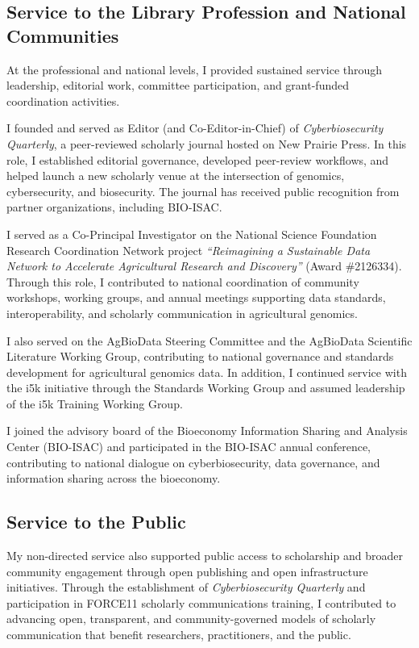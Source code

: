 \subsection*{Service to the Library Profession and National Communities}

At the professional and national levels, I provided sustained service through leadership, editorial work, committee participation, and grant-funded coordination activities.

I founded and served as Editor (and Co-Editor-in-Chief) of \textit{Cyberbiosecurity Quarterly}, a peer-reviewed scholarly journal hosted on New Prairie Press. In this role, I established editorial governance, developed peer-review workflows, and helped launch a new scholarly venue at the intersection of genomics, cybersecurity, and biosecurity. The journal has received public recognition from partner organizations, including BIO-ISAC.

I served as a Co-Principal Investigator on the National Science Foundation Research Coordination Network project \textit{``Reimagining a Sustainable Data Network to Accelerate Agricultural Research and Discovery''} (Award \#2126334). Through this role, I contributed to national coordination of community workshops, working groups, and annual meetings supporting data standards, interoperability, and scholarly communication in agricultural genomics.

I also served on the AgBioData Steering Committee and the AgBioData Scientific Literature Working Group, contributing to national governance and standards development for agricultural genomics data. In addition, I continued service with the i5k initiative through the Standards Working Group and assumed leadership of the i5k Training Working Group.

I joined the advisory board of the Bioeconomy Information Sharing and Analysis Center (BIO-ISAC) and participated in the BIO-ISAC annual conference, contributing to national dialogue on cyberbiosecurity, data governance, and information sharing across the bioeconomy.

\subsection*{Service to the Public}

My non-directed service also supported public access to scholarship and broader community engagement through open publishing and open infrastructure initiatives. Through the establishment of \textit{Cyberbiosecurity Quarterly} and participation in FORCE11 scholarly communications training, I contributed to advancing open, transparent, and community-governed models of scholarly communication that benefit researchers, practitioners, and the public.

